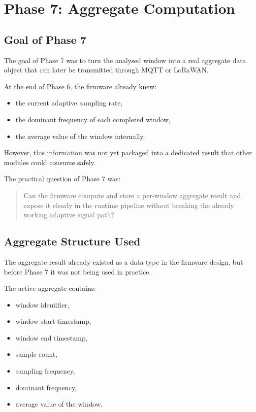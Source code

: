 \documentclass[12pt,a4paper]{article}
\begin{document}
\section{Phase 7: Aggregate Computation}

\subsection{Goal of Phase 7}

The goal of Phase 7 was to turn the analysed window into a real aggregate data
object that can later be transmitted through MQTT or LoRaWAN.

At the end of Phase 6, the firmware already knew:

\begin{itemize}
    \item the current adaptive sampling rate,
    \item the dominant frequency of each completed window,
    \item the average value of the window internally.
\end{itemize}

However, this information was not yet packaged into a dedicated result that
other modules could consume safely.

The practical question of Phase 7 was:

\begin{quote}
Can the firmware compute and store a per-window aggregate result and expose it
clearly in the runtime pipeline without breaking the already working adaptive
signal path?
\end{quote}

\subsection{Aggregate Structure Used}

The aggregate result already existed as a data type in the firmware design, but
before Phase 7 it was not being used in practice.

The active aggregate contains:

\begin{itemize}
    \item window identifier,
    \item window start timestamp,
    \item window end timestamp,
    \item sample count,
    \item sampling frequency,
    \item dominant frequency,
    \item average value of the window.
\end{itemize}
\end{document}
